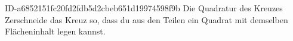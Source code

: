 \begin{exercise}
      {ID-a6852151fc20fd2fdb5d2cbeb651d19974598f9b}
      {Die Quadratur des Kreuzes}
  \ifproblem\problem
    Zerschneide das Kreuz so, dass du aus den Teilen ein Quadrat mit demselben
    Flächeninhalt legen kannst.
    \begin{center}
    \end{center}
  \fi
\end{exercise}
